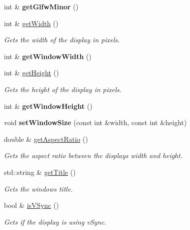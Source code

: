 \begin{DoxyCompactItemize}
int \& {\bfseries get\+Glfw\+Minor} ()
\item 
int \& \hyperlink{classflounder_1_1display_ac2b45bb8c8924b985895f2b08c03c3d9}{get\+Width} ()
\begin{DoxyCompactList}\small\item\em Gets the width of the display in pixels. \end{DoxyCompactList}\item 
\mbox{\label{classflounder_1_1display_ac47027c6b34d260ccaf148e4e762cdbe}} 
int \& {\bfseries get\+Window\+Width} ()
\item 
int \& \hyperlink{classflounder_1_1display_a2b3cea6e41121de9d790acf027036167}{get\+Height} ()
\begin{DoxyCompactList}\small\item\em Gets the height of the display in pixels. \end{DoxyCompactList}\item 
\mbox{\label{classflounder_1_1display_af1d306cb8353a7cdfe7daae4727028fc}} 
int \& {\bfseries get\+Window\+Height} ()
\item 
\mbox{\label{classflounder_1_1display_a13edcfe35505b3e164010ed1b232e5d1}} 
void {\bfseries set\+Window\+Size} (const int \&width, const int \&height)
\item 
double \& \hyperlink{classflounder_1_1display_a7b32aeb7809ad48663ce6eb4596b37a3}{get\+Aspect\+Ratio} ()
\begin{DoxyCompactList}\small\item\em Gets the aspect ratio between the displays width and height. \end{DoxyCompactList}\item 
std\+::string \& \hyperlink{classflounder_1_1display_ad5fc46c79d236783ac883878ec065f36}{get\+Title} ()
\begin{DoxyCompactList}\small\item\em Gets the window\textquotesingle{}s title. \end{DoxyCompactList}\item 
bool \& \hyperlink{classflounder_1_1display_a0cc7e0037aa9a45127de4db882c5a632}{is\+V\+Sync} ()
\begin{DoxyCompactList}\small\item\em Gets if the display is using v\+Sync. \end{DoxyCompactList}\item 

\end{DoxyCompactItemize}
